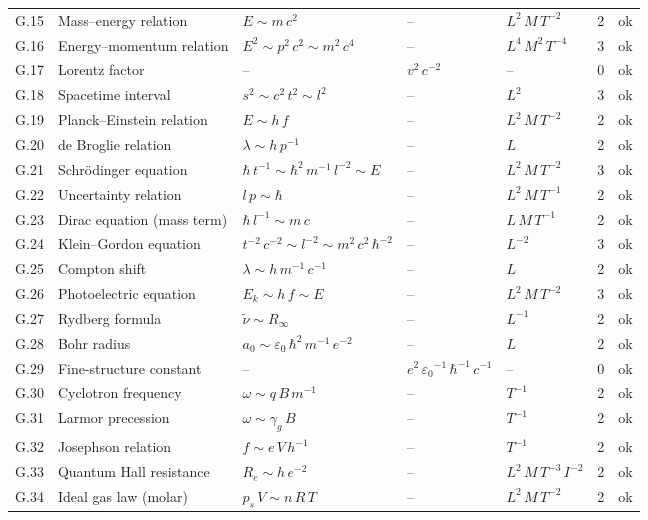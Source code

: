 {\begin{longtable}{@{}l>{\raggedright\arraybackslash}p{3.0cm}>{\raggedright\arraybackslash}p{5.6cm}>{\raggedright\arraybackslash}p{2.0cm}>{\raggedright\arraybackslash}p{2.3cm}rl@{}}
G.15 & Mass--energy relation & $E \sim m\,{c}^{2}$ & -- & $L^{2}\,M\,T^{-2}$ & 2 & ok \\
G.16 & Energy--momentum relation & ${E}^{2} \sim {p}^{2}\,{c}^{2} \sim {m}^{2}\,{c}^{4}$ & -- & $L^{4}\,M^{2}\,T^{-4}$ & 3 & ok \\
G.17 & Lorentz factor & -- & ${v}^{2}\,{c}^{-2}$ & -- & 0 & ok \\
G.18 & Spacetime interval & $s^2 \sim {c}^{2}\,{t}^{2} \sim {l}^{2}$ & -- & $L^{2}$ & 3 & ok \\
G.19 & Planck--Einstein relation & $E \sim h\,f$ & -- & $L^{2}\,M\,T^{-2}$ & 2 & ok \\
G.20 & de Broglie relation & $\lambda \sim h\,{p}^{-1}$ & -- & $L$ & 2 & ok \\
G.21 & Schr\"odinger equation & $\hbar\,{t}^{-1} \sim {\hbar}^{2}\,{m}^{-1}\,{l}^{-2} \sim E$ & -- & $L^{2}\,M\,T^{-2}$ & 3 & ok \\
G.22 & Uncertainty relation & $l\,p \sim \hbar$ & -- & $L^{2}\,M\,T^{-1}$ & 2 & ok \\
G.23 & Dirac equation (mass term) & $\hbar\,{l}^{-1} \sim m\,c$ & -- & $L\,M\,T^{-1}$ & 2 & ok \\
G.24 & Klein--Gordon equation & ${t}^{-2}\,{c}^{-2} \sim {l}^{-2} \sim {m}^{2}\,{c}^{2}\,{\hbar}^{-2}$ & -- & $L^{-2}$ & 3 & ok \\
G.25 & Compton shift & $\lambda \sim h\,{m}^{-1}\,{c}^{-1}$ & -- & $L$ & 2 & ok \\
G.26 & Photoelectric equation & $E_k \sim h\,f \sim E$ & -- & $L^{2}\,M\,T^{-2}$ & 3 & ok \\
G.27 & Rydberg formula & $\tilde\nu \sim R_\infty$ & -- & $L^{-1}$ & 2 & ok \\
G.28 & Bohr radius & $a_0 \sim \varepsilon_0\,{\hbar}^{2}\,{m}^{-1}\,{e}^{-2}$ & -- & $L$ & 2 & ok \\
G.29 & Fine-structure constant & -- & ${e}^{2}\,{\varepsilon_0}^{-1}\,{\hbar}^{-1}\,{c}^{-1}$ & -- & 0 & ok \\
G.30 & Cyclotron frequency & $\omega \sim q\,B\,{m}^{-1}$ & -- & $T^{-1}$ & 2 & ok \\
G.31 & Larmor precession & $\omega \sim \gamma_g\,B$ & -- & $T^{-1}$ & 2 & ok \\
G.32 & Josephson relation & $f \sim e\,V\,{h}^{-1}$ & -- & $T^{-1}$ & 2 & ok \\
G.33 & Quantum Hall resistance & $R_e \sim h\,{e}^{-2}$ & -- & $L^{2}\,M\,T^{-3}\,I^{-2}$ & 2 & ok \\
G.34 & Ideal gas law (molar) & $p_s\,V \sim n\,R\,T$ & -- & $L^{2}\,M\,T^{-2}$ & 2 & ok \\

\end{longtable}}
